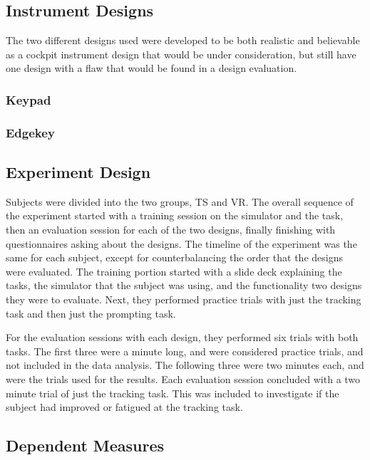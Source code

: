 \subsection{Instrument Designs}

The two different designs used were developed to be both realistic and believable as a cockpit instrument design that would be under consideration, but still have one design with a flaw that would be found in a design evaluation.

\subsubsection{Keypad}
\subsubsection{Edgekey}

\subsection{Experiment Design}

Subjects were divided into the two groups, TS and VR.
The overall sequence of the experiment started with a training session on the simulator and the task, then an evaluation session for each of the two designs, finally finishing with questionnaires asking about the designs.
The timeline of the experiment was the same for each subject, except for counterbalancing the order that the designs were evaluated.
The training portion started with a slide deck explaining the tasks, the simulator that the subject was using, and the functionality two designs they were to evaluate.
Next, they performed practice trials with just the tracking task and then just the prompting task.

For the evaluation sessions with each design, they performed six trials with both tasks.
The first three were a minute long, and were considered practice trials, and not included in the data analysis.
The following three were two minutes each, and were the trials used for the results.
Each evaluation session concluded with a two minute trial of just the tracking task.
This was included to investigate if the subject had improved or fatigued at the tracking task.

\subsection{Dependent Measures}

